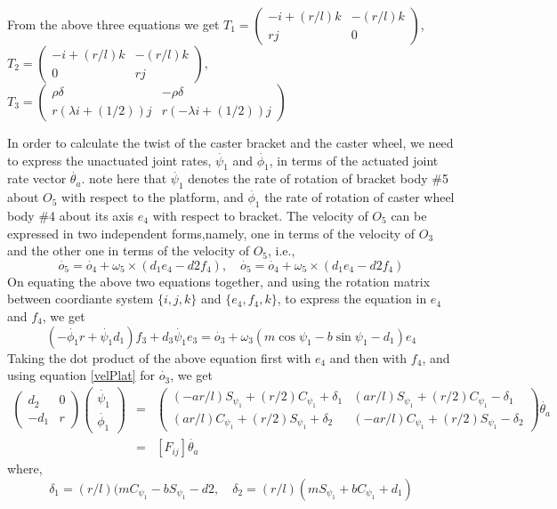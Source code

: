 From the above three equations we get 
$T_1=\begin{pmatrix}-i+(r/l)k & -(r/l)k\\ rj & 0\end{pmatrix}$,   
$T_2=\begin{pmatrix}	-i+(r/l)k & -(r/l)k\\  0 &rj \end{pmatrix}$, $T_3=\begin{pmatrix}
	\rho\delta & -\rho\delta\\
	r(\lambda i+(1/2))j & r(-\lambda i+(1/2))j
	\end{pmatrix}$


In order to calculate the twist of the caster bracket and the caster wheel, we need to express the  unactuated joint rates, $\dot{\psi_1}$ and $\dot{\phi_1}$, in terms of the actuated joint rate vector $\dot{\theta_a}$. note here that $\dot{\psi_1}$ denotes the rate of rotation of bracket body \#5 about $O_5$ with respect to the platform, and 
$\dot{\phi_1}$ the rate of rotation of caster wheel body \#4 about its axis $e_4$ with respect to bracket. The velocity of $O_5$ can be expressed in two independent forms,namely, one in terms of the velocity of $O_3$ and the other one in terms of the velocity of $O_5$, i.e.,
\begin{equation}
\dot{o_5}=\dot{o_4}+\omega_5\times(d_1e_4-d2f_4), \quad
\dot{o_5}=\dot{o_4}+\omega_5\times(d_1e_4-d2f_4)
\end{equation}
On equating the above two equations together, and using the rotation matrix between coordiante system $\{i,j,k\}$ and $\{e_4,f_4,k\}$, to express the equation in $e_4$ and $f_4$, we get
\begin{equation}
(-\dot{\phi_1}r+\dot{\psi_1}d_1)f_3+d_3\dot{\psi_1}e_3=\dot{o_3}
+\omega_3(m\cos\psi_1-b\sin\psi_1-d_1)e_4
\end{equation} 
Taking the dot product of the above equation first with $e_4$ and then with $f_4$, and using equation \ref{velPlat} for $\dot{o_3}$, we get
\begin{eqnarray}
\label{unac2act1}
\begin{pmatrix}
d_2&0\\-d_1 &r
\end{pmatrix}
\begin{pmatrix}
\dot{\psi_1}\\ \dot{\phi_1}
\end{pmatrix}
&=&\begin{pmatrix}
(-ar/l)S_{\psi_1}+(r/2)C_{\psi_1}+\delta_1 & 
(ar/l)S_{\psi_1}+(r/2)C_{\psi_1}-\delta_1 \\
(ar/l)C_{\psi_1}+(r/2)S_{\psi_1}+\delta_2 & 
(-ar/l)C_{\psi_1}+(r/2)S_{\psi_1}-\delta_2 
\end{pmatrix}\dot{\theta_a}\nonumber \\
&=&[F_{ij}]\dot{\theta_a}
\end{eqnarray}
where, 
\[ \delta_1=(r/l)(mC_{\psi_1}-bS_{\psi_1}-d2, \quad  \delta_2=(r/l)(mS_{\psi_1}+bC_{\psi_1}+d_1) \]

